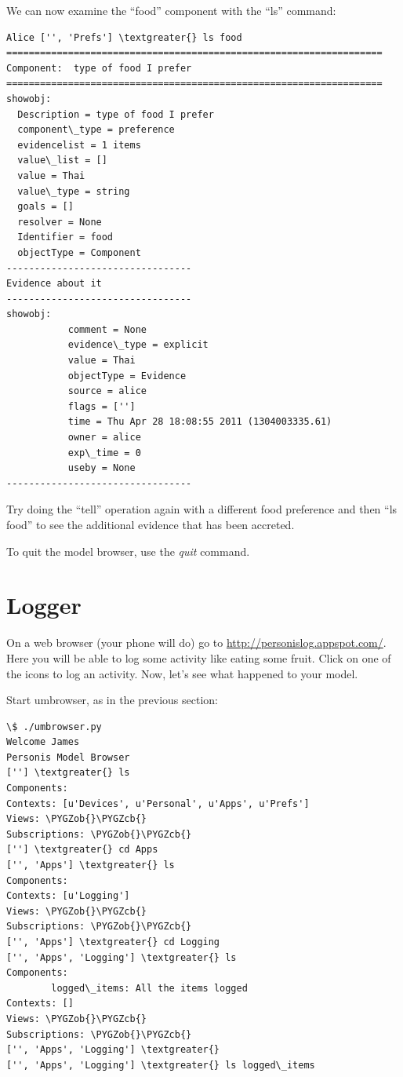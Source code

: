 \documentclass[letterpaper,10pt,english]{sphinxmanual}
\def\PYGZob{\char`\{}
\def\PYGZcb{\char`\}}
\begin{document}
We can now examine the ``food'' component with the ``ls'' command:

\begin{Verbatim}[commandchars=\\\{\}]
Alice ['', 'Prefs'] \textgreater{} ls food
===================================================================
Component:  type of food I prefer
===================================================================
showobj:
  Description = type of food I prefer
  component\_type = preference
  evidencelist = 1 items
  value\_list = []
  value = Thai
  value\_type = string
  goals = []
  resolver = None
  Identifier = food
  objectType = Component
---------------------------------
Evidence about it
---------------------------------
showobj:
           comment = None
           evidence\_type = explicit
           value = Thai
           objectType = Evidence
           source = alice
           flags = ['']
           time = Thu Apr 28 18:08:55 2011 (1304003335.61)
           owner = alice
           exp\_time = 0
           useby = None
---------------------------------
\end{Verbatim}

Try doing the ``tell'' operation again with a different food preference and then ``ls food'' to see the additional
evidence that has been accreted.

To quit the model browser, use the \emph{quit} command.


\section{Logger}
\label{Tutorial:logger}
On a web browser (your phone will do) go to \href{http://personislog.appspot.com/}{http://personislog.appspot.com/}. Here you will be able to log some activity like eating some fruit. Click on one of the icons to log an activity. Now, let's see what happened to your model.

Start umbrowser, as in the previous section:

\begin{Verbatim}[commandchars=\\\{\}]
\$ ./umbrowser.py
Welcome James
Personis Model Browser
[''] \textgreater{} ls
Components:
Contexts: [u'Devices', u'Personal', u'Apps', u'Prefs']
Views: \PYGZob{}\PYGZcb{}
Subscriptions: \PYGZob{}\PYGZcb{}
[''] \textgreater{} cd Apps
['', 'Apps'] \textgreater{} ls
Components:
Contexts: [u'Logging']
Views: \PYGZob{}\PYGZcb{}
Subscriptions: \PYGZob{}\PYGZcb{}
['', 'Apps'] \textgreater{} cd Logging
['', 'Apps', 'Logging'] \textgreater{} ls
Components:
        logged\_items: All the items logged
Contexts: []
Views: \PYGZob{}\PYGZcb{}
Subscriptions: \PYGZob{}\PYGZcb{}
['', 'Apps', 'Logging'] \textgreater{}
['', 'Apps', 'Logging'] \textgreater{} ls logged\_items
\end{Verbatim}
\end{document}
